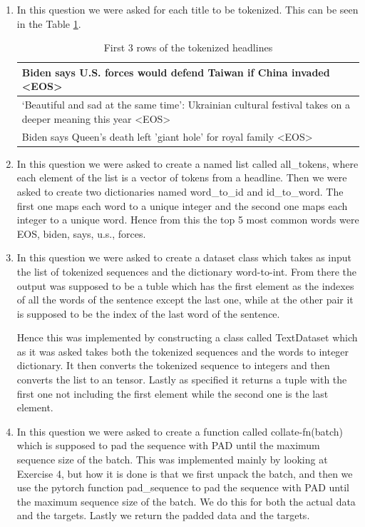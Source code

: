 \documentclass[a4paper]{article}
\begin{document}
\begin{enumerate}
    \item In this question we were asked for each title to be tokenized. This can be seen in the Table \ref{tab:headlines}.
          \begin{table}[H]
              \centering
              \caption{First 3 rows of the tokenized headlines}
              \label{tab:headlines}
              \begin{tabular}{|p{}|}
                  \hline
                  Biden says U.S. forces would defend Taiwan if China invaded \textless EOS\textgreater                                           \\
                  \hline
                  ‘Beautiful and sad at the same time’: Ukrainian cultural festival takes on a deeper meaning this year \textless EOS\textgreater \\
                  \hline
                  Biden says Queen's death left 'giant hole' for royal family \textless EOS\textgreater                                           \\
                  \hline
              \end{tabular}
          \end{table}
    \item In this question we were asked to create a named list called all\_tokens, where each element of the list is a vector of tokens from a headline. Then we were asked to create two dictionaries named word\_to\_id and id\_to\_word. The first one maps each word to a unique integer and the second one maps each integer to a unique word. Hence from this the top 5 most common words were EOS, biden, says, u.s., forces.
    \item In this question we were asked to create a dataset class which takes as input the list of tokenized sequences and the dictionary word-to-int. From there the output was supposed to be a tuble which has the first element as the indexes of all the words of the sentence except the last one, while at the other pair it is supposed to be the index of the last word of the sentence.

          Hence this was implemented by constructing a class called TextDataset which as it was asked takes both the tokenized sequences and the words to integer dictionary. It then converts the tokenized sequence to integers and then converts the list to an tensor. Lastly as specified it returns a tuple with the first one not including the first element while the second one is the last element.
    \item In this question we were asked to create a function called collate-fn(batch) which is supposed to pad the sequence with PAD until the maximum sequence size of the batch. This was implemented mainly by looking at Exercise 4, but how it is done is that we first unpack the batch, and then we use the pytorch function pad\_sequence to pad the sequence with PAD until the maximum sequence size of the batch. We do this for both the actual data and the targets. Lastly we return the padded data and the targets.
\end{enumerate}
\end{document}
